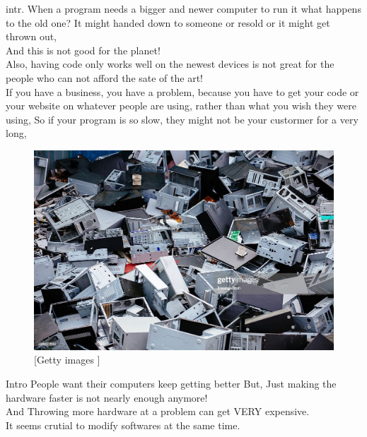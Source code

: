 \documentclass{beamer}
\begin{document}
\begin{frame}{intr.}
When a program needs a bigger and newer computer to run it what happens to the old one? It might handed down to someone or resold or it might get thrown out,\\
And this is not good for the planet!\\
Also, having code only works well on the newest devices is not great for the people who can not afford the sate of the art!\\
If you have a business, you have a problem, because you have to get your code or your website on whatever people are using, rather than what you wish they were using, So if your program is so slow, they might not be your custormer for a very long,\\
\begin{figure}[!htbp]
\centering
\includegraphics[width=3 in , height=2 in]{Figures/laptop.jpg}
\caption{\tiny[Getty images ]}
\end{figure}
\end{frame}

\begin{frame}{Intro}
People want their computers keep getting better But, Just making the hardware faster is not nearly enough anymore!\\
And Throwing more hardware at a problem can get VERY expensive.\\
It seems crutial to modify softwares at the same time.
\end{frame}
\end{document}
